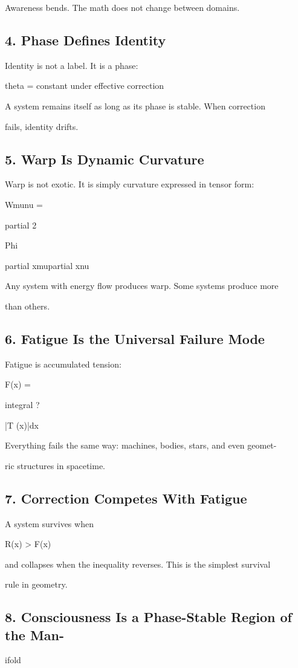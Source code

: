 \documentclass[10pt]{article}
\begin{document}
Awareness bends. The math does not change between domains.

\subsection*{4. Phase Defines Identity}
Identity is not a label. It is a phase:

theta = constant under effective correction

A system remains itself as long as its phase is stable. When correction

fails, identity drifts.

\subsection*{5. Warp Is Dynamic Curvature}
Warp is not exotic. It is simply curvature expressed in tensor form:

Wmunu =

partial 2

Phi

partial xmupartial xnu

Any system with energy flow produces warp. Some systems produce more

than others.


\subsection*{6. Fatigue Is the Universal Failure Mode}
Fatigue is accumulated tension:

F(x) =

integral ?

|T (x)|dx

Everything fails the same way: machines, bodies, stars, and even geomet-

ric structures in spacetime.

\subsection*{7. Correction Competes With Fatigue}
A system survives when

R(x) > F(x)

and collapses when the inequality reverses. This is the simplest survival

rule in geometry.

\subsection*{8. Consciousness Is a Phase-Stable Region of the Man-}
ifold
\end{document}
